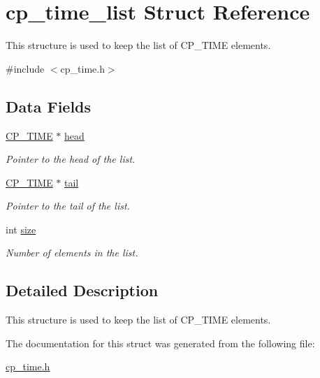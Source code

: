 \hypertarget{structcp__time__list}{\section{cp\-\_\-time\-\_\-list Struct Reference}
\label{structcp__time__list}
}


This structure is used to keep the list of C\-P\-\_\-\-T\-I\-M\-E elements.  




{\ttfamily \#include $<$cp\-\_\-time.\-h$>$}

\subsection*{Data Fields}
{\bf }\par
\begin{DoxyCompactItemize}
\item 
\hypertarget{structcp__time__list_a1b2e755cebea4bc4cd162c2b5f45c24e}{\hyperlink{cp__time_8h_a882d2e5771b02eac787fc6614dc7fa61}{C\-P\-\_\-\-T\-I\-M\-E} $\ast$ \hyperlink{structcp__time__list_a1b2e755cebea4bc4cd162c2b5f45c24e}{head}}\label{structcp__time__list_a1b2e755cebea4bc4cd162c2b5f45c24e}

\begin{DoxyCompactList}\small\item\em Pointer to the head of the list. \end{DoxyCompactList}\item 
\hypertarget{structcp__time__list_a1c2462bb4873595cf7ec8d9be0d773b0}{\hyperlink{cp__time_8h_a882d2e5771b02eac787fc6614dc7fa61}{C\-P\-\_\-\-T\-I\-M\-E} $\ast$ \hyperlink{structcp__time__list_a1c2462bb4873595cf7ec8d9be0d773b0}{tail}}\label{structcp__time__list_a1c2462bb4873595cf7ec8d9be0d773b0}

\begin{DoxyCompactList}\small\item\em Pointer to the tail of the list. \end{DoxyCompactList}\item 
\hypertarget{structcp__time__list_a86b08fbf726fa594360b14617173d086}{int \hyperlink{structcp__time__list_a86b08fbf726fa594360b14617173d086}{size}}\label{structcp__time__list_a86b08fbf726fa594360b14617173d086}

\begin{DoxyCompactList}\small\item\em Number of elements in the list. \end{DoxyCompactList}\end{DoxyCompactItemize}



\subsection{Detailed Description}
This structure is used to keep the list of C\-P\-\_\-\-T\-I\-M\-E elements. 

The documentation for this struct was generated from the following file\-:\begin{DoxyCompactItemize}
\item 
\hyperlink{cp__time_8h}{cp\-\_\-time.\-h}\end{DoxyCompactItemize}
